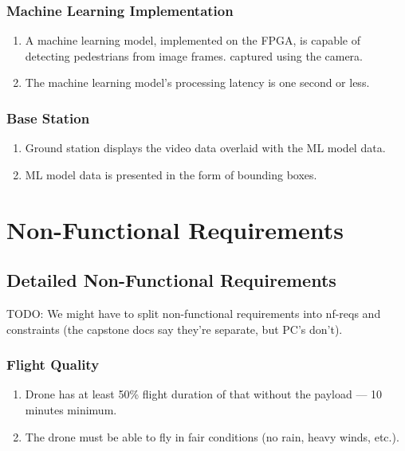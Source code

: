 \documentclass[10pt,letterpaper]{article}
\begin{document}
\subsubsection{Machine Learning Implementation}
\begin{enumerate}[{F.ML}.1:]
\item A machine learning model, implemented on the FPGA, is capable of detecting pedestrians from image frames. captured using the camera.
\item The machine learning model's processing latency is one second or less.

\end{enumerate}

\subsubsection{Base Station}
\begin{enumerate}[{F.BS}.1:]
    \item Ground station displays the video data overlaid with the ML model data.
	\item ML model data is presented in the form of bounding boxes.
\end{enumerate}

\section{Non-Functional Requirements}\label{section:non-func-spec}

\subsection{Detailed Non-Functional Requirements}

TODO: We might have to split non-functional requirements into nf-reqs and constraints (the capstone docs say they're separate, but PC's don't).

\subsubsection{Flight Quality}
\begin{enumerate}[{NF.FQ}.1:]
    \item Drone has at least 50\% flight duration of that without the payload --- 10 minutes minimum.
    \item The drone must be able to fly in fair conditions (no rain, heavy winds, etc.).
\end{enumerate}
\end{document}
